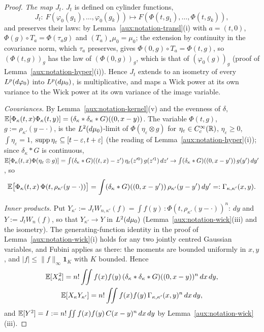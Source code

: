\begin{proof}
\emph{The map $J_t$.}  $J_t$ is defined on cylinder functions,
\[
 J_t:\ F(\varphi_0(g_1),\dots,\varphi_0(g_k))\longmapsto F(\Phi(t,g_1),\dots,\Phi(t,g_k)),
\]
and preserves their laws: by Lemma~\ref{aux:notation-transl}(i) with $a=(t,0)$, $\Phi(g)\circ T_a=\Phi(\tau_ag)$
and $(T_a)_*\mu_0=\mu_0$; the extension by continuity in the covariance norm, which $\tau_a$
preserves, gives $\Phi(0,g)\circ T_a=\Phi(t,g)$, so $(\Phi(t,g))_g$ has the law of $(\Phi(0,g))_g$,
which is that of $(\varphi_0(g))_g$ (proof of Lemma~\ref{aux:notation-hyper}(i)).  Hence $J_t$
extends to an isometry of every $L^p(d\varphi_0)$ into $L^p(d\mu_0)$, is multiplicative, and maps a Wick
power at its own variance to the Wick power at its own variance of the image variable.

\emph{Covariances.}  By Lemma~\ref{aux:notation-kernel}(v) and the evenness of $\delta$,
$\mathbb{E}[\Phi_\kappa(t,x)\Phi_\kappa(t,y)]=(\delta_\kappa*\delta_\kappa*G)((0,x-y))$.  The variable
$\Phi(t,g)$, $g:=\rho_{\kappa'}(y-\cdot)$, is the $L^2(d\mu_0)$-limit of $\Phi(\eta_\varepsilon\otimes
g)$ for $\eta_\varepsilon\in C_c^\infty(\mathbb{R})$, $\eta_\varepsilon\ge0$, $\int\eta_\varepsilon=1$,
$\operatorname{supp}\eta_\varepsilon\subseteq[t-\varepsilon,t+\varepsilon]$ (the reading of
Lemma~\ref{aux:notation-hyper}(i)); since $\delta_\kappa*G$ is continuous,
$\mathbb{E}[\Phi_\kappa(t,x)\Phi(\eta_\varepsilon\otimes g)]=\int(\delta_\kappa*G)((t,x)-z')\,
\eta_\varepsilon(z'^0)\,g(z'^1)\,dz'\to\int(\delta_\kappa*G)((0,x-y'))\,g(y')\,dy'$, so
\[
 \mathbb{E}\bigl[\Phi_\kappa(t,x)\,\Phi(t,\rho_{\kappa'}(y-\cdot))\bigr]
 =\int(\delta_\kappa*G)((0,x-y'))\,\rho_{\kappa'}(y-y')\,dy'=:\Gamma_{\kappa,\kappa'}(x,y) .
\]

\emph{Inner products.}  Put $Y_{\kappa'}:=J_tW_{n,\kappa'}(f)=\int f(y)\,{:}\Phi(t,\rho_{\kappa'}
(y-\cdot))^n{:}\,dy$ and $Y:=J_tW_n(f)$, so that $Y_{\kappa'}\to Y$ in $L^2(d\mu_0)$
(Lemma~\ref{aux:notation-wick}(iii) and the isometry).  The generating-function identity in the
proof of Lemma~\ref{aux:notation-wick}(i) holds for any two jointly centred Gaussian variables, and
Fubini applies as there: the moments are bounded uniformly in $x,y$, and $|f|\le\|f\|_\infty
\mathbf 1_K$ with $K$ bounded.  Hence
\begin{gather*}
 \mathbb{E}[X_\kappa^2]=n!\iint f(x)f(y)\,(\delta_\kappa*\delta_\kappa*G)((0,x-y))^n\,dx\,dy,\\
 \mathbb{E}[X_\kappa Y_{\kappa'}]=n!\iint f(x)f(y)\,\Gamma_{\kappa,\kappa'}(x,y)^n\,dx\,dy ,
\end{gather*}
and $\mathbb{E}[Y^2]=I:=n!\iint f(x)f(y)\,C(x-y)^n\,dx\,dy$ by Lemma~\ref{aux:notation-wick}(iii).


\end{proof}
